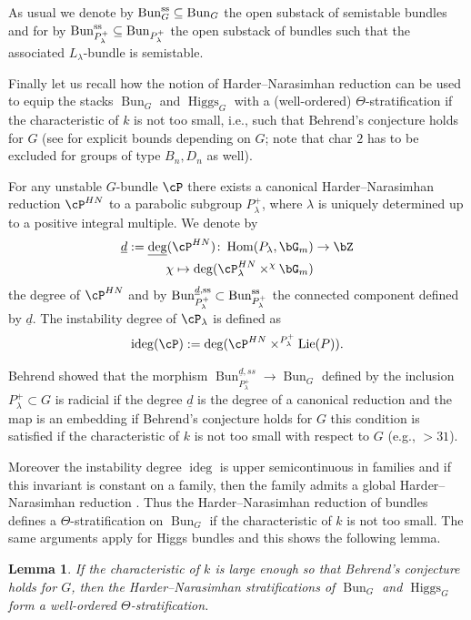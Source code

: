 \documentclass[a4paper]{amsart}
\numberwithin{equation}{section}
\theoremstyle{plain}
\newtheorem{lem}[thm]{Lemma}
\theoremstyle{definition}
\DeclareMathOperator{\Hom}{Hom}
\DeclareMathOperator{\Bun}{Bun}
\newcommand{\co}{\colon}
\renewcommand{\ss}{{\rm ss}}
\DeclareMathOperator{\Lie}{Lie}
\DeclareMathOperator{\Higgs}{Higgs}
\DeclareMathOperator{\ideg}{ideg}
\begin{document}
As usual we denote by $\Bun_G^{\ss} \subseteq \Bun_G$ the open substack of semistable bundles and for by $\Bun_{P_\lambda^+}^{\ss} \subseteq \Bun_{P_\lambda^+}$ the open substack of bundles such that the associated $L_\lambda$-bundle is semistable.

Finally let us recall how the notion of Harder--Narasimhan reduction can be used to equip the stacks $\Bun_G$ and $\Higgs_G$ with a (well-ordered) $\Theta$-stratification if the characteristic of $k$ is not too small, i.e., such that Behrend's conjecture holds for $G$ (see \cite[Thm.~1]{heinloth-bounds} for explicit bounds depending on $G$; note that char $2$ has to be excluded for groups of type $B_n,D_n$ as well).

For any unstable $G$-bundle $\cP$ there exists a canonical Harder--Narasimhan reduction $\cP^{HN}$ to a parabolic subgroup $P_\lambda^+$, where $\lambda$ is uniquely determined up to a positive integral multiple. We denote by 
\begin{align*}
\underline{d}:=\underline{\deg}(\cP^{HN})\co \Hom(P_\lambda,\bG_m) &\to \bZ\\
\chi \mapsto \deg(\cP_\lambda^{HN} \times^\chi \bG_m)
\end{align*}
the degree of $\cP^{HN}$ and by $\Bun_{P_\lambda^+}^{\underline{d},\ss}\subset \Bun_{P_\lambda^+}^{\ss}$ the connected component defined by $\underline{d}$. The instability degree of $\cP_\lambda$ is defined as 
$$ \ideg(\cP) := \deg(\cP^{HN}\times^{P_\lambda^+}\Lie(P)).$$

Behrend showed that the morphism $\Bun_{P_\lambda^+}^{\underline{d},ss} \to \Bun_G$ defined by the inclusion $P_\lambda^+\subset G$ is radicial if the degree $\underline{d}$ is the degree of a canonical reduction \cite{behrend-thesis} and the map is an embedding if Behrend's conjecture holds for $G$ \cite[Lem.~2.3]{heinloth-semistable} this condition is satisfied if the characteristic of $k$ is not too small with respect to $G$ (e.g., $>31$).

Moreover the instability degree $\ideg$ is upper semicontinuous in families and if this invariant is constant on a family, then the family admits a global Harder--Narasimhan reduction \cite[Prop.~7.1.3]{behrend-thesis}\cite[Prop.~2.2]{heinloth-semistable}. Thus the Harder--Narasimhan reduction of bundles defines a $\Theta$-stratification on $\Bun_G$ if the characteristic of $k$ is not too small. The same arguments apply for Higgs bundles and this shows the following lemma.

\begin{lem}
	If the characteristic of $k$ is large enough so that Behrend's conjecture holds for $G$, then the Harder--Narasimhan stratifications of $\Bun_G$ and $\Higgs_G$ form a well-ordered $\Theta$-stratification.
\end{lem}	
\end{document}
